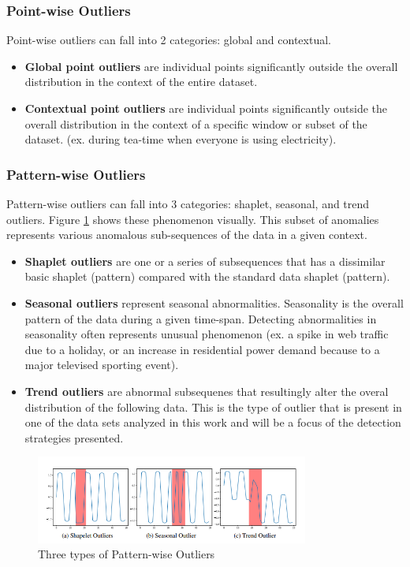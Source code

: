 \subsubsection{Point-wise Outliers}
Point-wise outliers can fall into 2 categories: global and contextual.
\begin{itemize}
    \item \textbf{Global point outliers} are individual points significantly outside the overall distribution in the context of the entire dataset.
    \item \textbf{Contextual point outliers} are individual points significantly outside the overall distribution in the context of a specific window or subset of the dataset. (ex. during tea-time when everyone is using electricity).
\end{itemize} 
\subsubsection{Pattern-wise Outliers}
Pattern-wise outliers can fall into 3 categories: shaplet, seasonal, and trend outliers. Figure \ref{fig:contextual-outliers} shows these phenomenon visually. This subset of anomalies represents various anomalous sub-sequences of the data in a given context. 
\begin{itemize}
    \item \textbf{Shaplet outliers} are one or a series of subsequences that has a dissimilar basic shaplet (pattern) compared with the standard data shaplet (pattern).
    \item \textbf{Seasonal outliers} represent seasonal abnormalities. Seasonality is the overall pattern of the data during a given time-span. Detecting abnormalities in seasonality often represents unusual phenomenon (ex. a spike in web traffic due to a holiday, or an increase in residential power demand because to a major televised sporting event). 
    \item \textbf{Trend outliers} are abnormal subsequenes that resultingly alter the overal distribution of the following data. This is the type of outlier that is present in one of the data sets analyzed in this work and will be a focus of the detection strategies presented. 
\end{itemize} 

\begin{figure}[H]
    \includegraphics[width=0.8\textwidth]{Images/contextual_outliers_graphic.PNG}
    \caption{Three types of Pattern-wise Outliers \parencite{lai2021revisiting}}
    \label{fig:contextual-outliers}
\end{figure}

